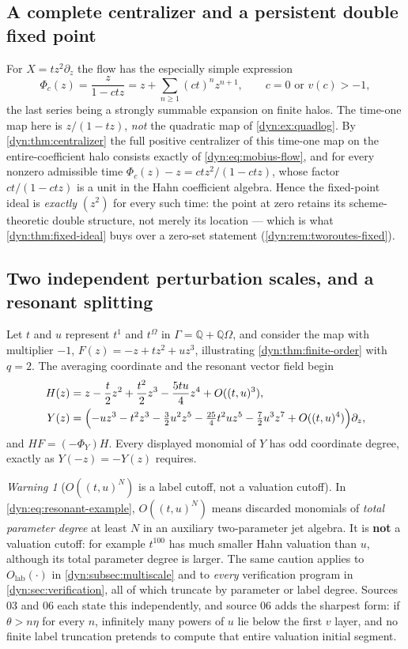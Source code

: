 \documentclass[11pt,letterpaper]{article}
\theoremstyle{definition}
\theoremstyle{remark}
\newtheorem{warning}[warning]{Warning}
\newcommand{\Q}{\mathbb Q}
\numberwithin{equation}{section}
\begin{document}
\subsection{A complete centralizer and a persistent double fixed point}
For $X=tz^{2}\partial_z$ the flow has the especially simple expression
\begin{equation}\label{dyn:eq:mobius-flow}
 \Phi_c(z)=\frac{z}{1-ctz}=z+\sum_{n\ge1}(ct)^{n}z^{n+1},
 \qquad c=0\text{ or }v(c)>-1,
\end{equation}
the last series being a strongly summable expansion on finite halos. The
time-one map here is $z/(1-tz)$, \emph{not} the quadratic map of
\cref{dyn:ex:quadlog}. By \cref{dyn:thm:centralizer} the full positive
centralizer of this time-one map on the entire-coefficient halo consists
exactly of \eqref{dyn:eq:mobius-flow}, and for every nonzero admissible
time $\Phi_c(z)-z=ctz^{2}/(1-ctz)$, whose factor $ct/(1-ctz)$ is a unit in
the Hahn coefficient algebra. Hence the fixed-point ideal is \emph{exactly}
$(z^{2})$ for every such time: the point at zero retains its
scheme-theoretic double structure, not merely its location --- which is
what \cref{dyn:thm:fixed-ideal} buys over a zero-set statement
(\cref{dyn:rem:tworoutes-fixed}).

\subsection{Two independent perturbation scales, and a resonant splitting}
Let $t$ and $u$ represent $t^{1}$ and $t^{\Omega}$ in
$\Gamma=\Q+\Q\Omega$, and consider the map with multiplier $-1$,
$F(z)=-z+tz^{2}+uz^{3}$, illustrating \cref{dyn:thm:finite-order} with
$q=2$. The averaging coordinate and the resonant vector field begin
\begin{align}\label{dyn:eq:resonant-example}
 H(z)&=z-\frac{t}{2}z^{2}+\frac{t^{2}}{2}z^{3}-\frac{5tu}{4}z^{4}
 +O((t,u)^{3}),\\
 Y(z)&=\Bigl(-uz^{3}-t^{2}z^{3}-\tfrac32u^{2}z^{5}
 -\tfrac{25}4t^{2}uz^{5}-\tfrac72u^{3}z^{7}+O((t,u)^{4})\Bigr)\partial_z,
 \notag
\end{align}
and $HF=(-\Phi_Y)H$. Every displayed monomial of $Y$ has odd coordinate
degree, exactly as $Y(-z)=-Y(z)$ requires.

\begin{warning}[$O((t,u)^{N})$ is a label cutoff, not a valuation cutoff]
\label{dyn:warn:labelcutoff}
In \eqref{dyn:eq:resonant-example}, $O((t,u)^{N})$ means discarded
monomials of \emph{total parameter degree} at least $N$ in an auxiliary
two-parameter jet algebra. It is \textbf{not} a valuation cutoff: for
example $t^{100}$ has much smaller Hahn valuation than $u$, although its
total parameter degree is larger. The same caution applies to
$O_{\mathrm{lab}}(\cdot)$ in \cref{dyn:subsec:multiscale} and to
\emph{every} verification program in \cref{dyn:sec:verification}, all of
which truncate by parameter or label degree. Sources 03 and 06 each state
this independently, and source 06 adds the sharpest form: if
$\theta>n\eta$ for every $n$, infinitely many powers of $u$ lie below the
first $v$ layer, and no finite label truncation pretends to compute that
entire valuation initial segment.
\end{warning}
\end{document}
